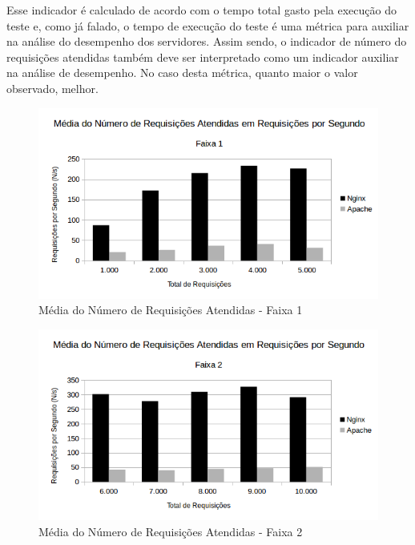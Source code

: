 Esse indicador é calculado de acordo com o tempo total gasto pela execução do 
teste e, como já falado, o tempo de execução do teste é uma métrica para 
auxiliar na análise do desempenho dos servidores. Assim sendo, o indicador de 
número do requisições atendidas também deve ser interpretado como um indicador 
auxiliar na análise de desempenho. No caso desta métrica, quanto maior o valor 
observado, melhor.

\begin{figure}[H]
	\centering
	\includegraphics[width=1\linewidth]{graficos/grafico4-f1} 
	\caption{Média do Número de Requisições Atendidas - Faixa 1}
	\label{fig:grafico4-f1}
\end{figure}

\begin{figure}[H]
	\centering
	\includegraphics[width=1\linewidth]{graficos/grafico4-f2} 
	\caption{Média do Número de Requisições Atendidas - Faixa 2}
	\label{fig:grafico4-f2}
\end{figure}

